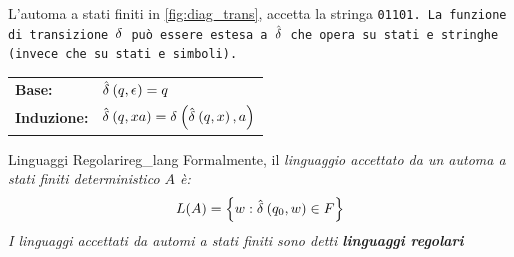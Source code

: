 \documentclass[11pt, a4paper]{article}
\begin{document}
L'automa a stati finiti in \cref{fig:diag_trans}, accetta la stringa \tt{01101}.
\emptyln{}
La funzione di transizione ${\delta}^{}$ può essere estesa a $\hat{{\delta}^{}}$ che opera su stati e stringhe (invece che su stati e simboli).
\begin{flushleft}
    \begin{tabular}{ll}
        \bf{Base}: &$\hat{{\delta}^{}}\left({q, {\epsilon}^{}}\right) = q$ \\
        \bf{Induzione}: &$\hat{{\delta}^{}}\left({q, xa}\right) = {\delta}^{}\left({\hat{{\delta}^{}}\left({q, x}\right), a}\right)$
    \end{tabular}
\end{flushleft}
\begin{definition}{Linguaggi Regolari}{reg_lang}
    Formalmente, il \it{linguaggio accettato} da un automa a stati finiti deterministico $A$ è:
    \begin{equation*}
        L(A) = \left\{{w: \hat{{\delta}^{}}\left({{q}_{0}, w}\right) \in F}\right\}
    \end{equation*}
    I linguaggi accettati da automi a stati finiti sono detti \bf{linguaggi regolari}
\end{definition}
%
\end{document}

